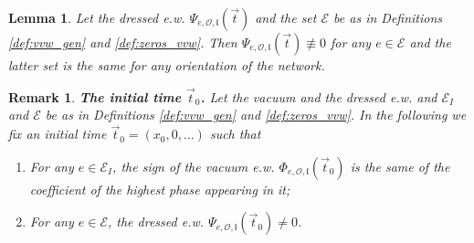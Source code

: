 \documentclass[11pt]{amsart}
\theoremstyle{plain}
\numberwithin{equation}{section}
\newtheorem{lemma}[theorem]{Lemma}
\newtheorem{remark}{Remark}[subsection]
\begin{document}
\begin{lemma}
Let the dressed e.w. $\Psi_{e, \mathcal O,\mathfrak l} (\vec t)$ and the set $\mathcal E$ be as in Definitions \ref{def:vvw_gen} and \ref{def:zeros_vvw}. Then $\Psi_{e, \mathcal O,\mathfrak l} (\vec t) \not \equiv 0$ for any $e\in \mathcal E$ and the latter set is the same for any orientation of the network.
\end{lemma}

\begin{remark}\label{rem:t_0}\textbf{The initial time $\vec t_0$.}
Let the vacuum and the dressed e.w. and $\mathcal E_I$ and $\mathcal E$ be as in Definitions \ref{def:vvw_gen}  and \ref{def:zeros_vvw}. In the following we fix an initial time $\vec t_0= (x_0,0,\dots)$ such that
\begin{enumerate}
\item For any $e\in \mathcal E_I$, the sign of the vacuum e.w. $\Phi_{e, \mathcal O,\mathfrak l} (\vec t_0)$ is the same of the coefficient of the highest phase appearing in it;
\item For any $e\in \mathcal E$, the dressed e.w. $\Psi_{e, \mathcal O,\mathfrak l} (\vec t_0) \not = 0$.
\end{enumerate}
\end{remark}
\end{document}
